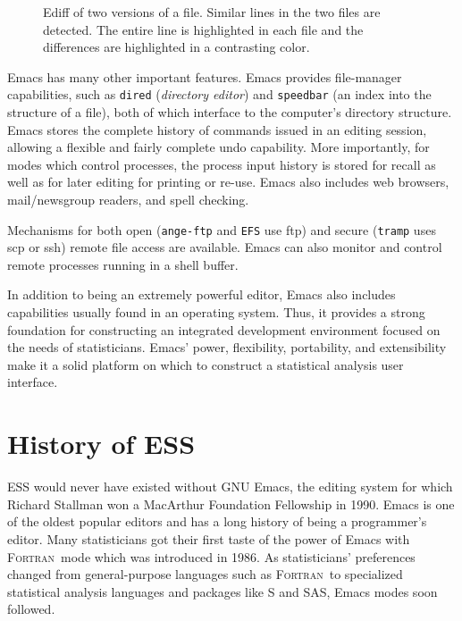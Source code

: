 \documentclass{article}
\newcommand*{\SAS}{\textsc{SAS}}
\newcommand*{\Fortran}{\textsc{Fortran}}
\newcommand{\stexttt}[1]{{\small\texttt{#1}}}
\begin{document}
\begin{figure}[tbp]
  \caption{Ediff of two versions of a file.  Similar lines in the two files
are detected.  The entire line is highlighted in each file and the differences
are highlighted in a contrasting color.}
  \label{f.ediff}
\end{figure}

Emacs has many other important features.  Emacs provides file-manager
capabilities, such as \stexttt{dired} (\textit{directory editor}) and
\stexttt{speedbar} (an index into the structure of a file), both of
which interface to the computer's directory structure.  Emacs stores
the complete history of commands issued in an editing session,
allowing a flexible and fairly complete undo capability.  More
importantly, for modes which control processes, the process input
history is stored for recall as well as for later editing for printing
or re-use.  Emacs also includes web browsers, mail/newsgroup readers,
and spell checking.

Mechanisms for both open (\stexttt{ange-ftp} and \stexttt{EFS} use
ftp) and secure (\stexttt{tramp} uses scp or ssh) remote file access
are available.  Emacs can also monitor and control remote processes
running in a shell buffer.

In addition to being an extremely powerful editor, Emacs also includes
capabilities usually found in an operating system.  Thus, it provides
a strong foundation for constructing an integrated development
environment focused on the needs of statisticians.  Emacs' power,
flexibility, portability, and extensibility make it a solid platform
on which to construct a statistical analysis user interface.

\section{History of ESS}
\label{sec:ESS:history}

ESS would never have existed without GNU Emacs, the editing system for
which Richard Stallman won a MacArthur Foundation Fellowship in 1990.
Emacs is one of the oldest popular editors and has a long history of
being a programmer's editor.  Many statisticians got their first taste
of the power of Emacs with \Fortran\ mode which was introduced in
1986.  As statisticians' preferences changed from general-purpose
languages such as \Fortran\ to specialized statistical analysis
languages and packages like S and \SAS, Emacs modes soon followed.
\end{document}

